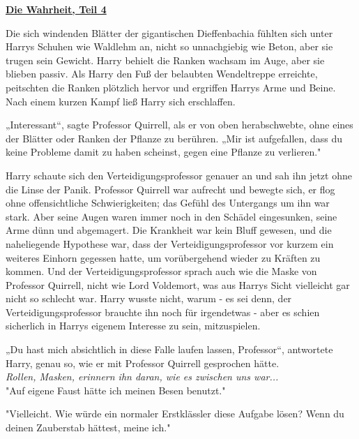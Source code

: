 

\hypertarget{die-wahrheit-teil-4}{%

\textbf{\uline{Die Wahrheit, Teil 4}}

\hfill\break Die sich windenden Blätter der gigantischen Dieffenbachia fühlten sich unter Harrys Schuhen wie Waldlehm an, nicht so unnachgiebig wie Beton, aber sie trugen sein Gewicht. Harry behielt die Ranken wachsam im Auge, aber sie blieben passiv. Als Harry den Fuß der belaubten Wendeltreppe erreichte, peitschten die Ranken plötzlich hervor und ergriffen Harrys Arme und Beine. Nach einem kurzen Kampf ließ Harry sich erschlaffen.

„Interessant“, sagte Professor Quirrell, als er von oben herabschwebte, ohne eines der Blätter oder Ranken der Pflanze zu berühren. „Mir ist aufgefallen, dass du keine Probleme damit zu haben scheinst, gegen eine Pflanze zu verlieren."

Harry schaute sich den Verteidigungsprofessor genauer an und sah ihn jetzt ohne die Linse der Panik. Professor Quirrell war aufrecht und bewegte sich, er flog ohne offensichtliche Schwierigkeiten; das Gefühl des Untergangs um ihn war stark. Aber seine Augen waren immer noch in den Schädel eingesunken, seine Arme dünn und abgemagert. Die Krankheit war kein Bluff gewesen, und die naheliegende Hypothese war, dass der Verteidigungsprofessor vor kurzem ein weiteres Einhorn gegessen hatte, um vorübergehend wieder zu Kräften zu kommen. Und der Verteidigungsprofessor sprach auch wie die Maske von Professor Quirrell, nicht wie Lord Voldemort, was aus Harrys Sicht vielleicht gar nicht so schlecht war. Harry wusste nicht, warum - es sei denn, der Verteidigungsprofessor brauchte ihn noch für irgendetwas - aber es schien sicherlich in Harrys eigenem Interesse zu sein, mitzuspielen.

„Du hast mich absichtlich in diese Falle laufen lassen, Professor“, antwortete Harry, genau so, wie er mit Professor Quirrell gesprochen hätte.\\ \emph{Rollen, Masken, erinnern ihn daran, wie es zwischen uns war...}\\ "Auf eigene Faust hätte ich meinen Besen benutzt."

"Vielleicht. Wie würde ein normaler Erstklässler diese Aufgabe lösen? Wenn du deinen Zauberstab hättest, meine ich."

}
